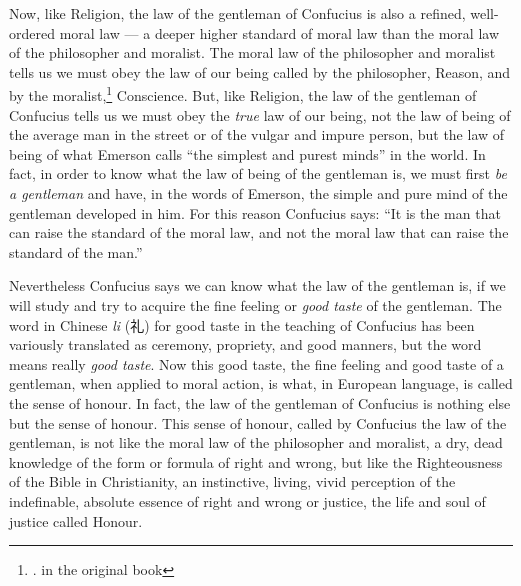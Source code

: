Now, like Religion, the law of the gentleman of Confucius is also a refined, well-ordered moral law --- a deeper higher standard of moral law than the moral law of the philosopher and moralist.
The moral law of the philosopher and moralist tells us we must obey the law of our being called by the philosopher, Reason, and by the moralist,\footnote{. in the original book} Conscience.
But, like Religion, the law of the gentleman of Confucius tells us we must obey the \emph{true} law of our being, not the law of being of the average man in the street or of the vulgar and impure person, but the law of being of what Emerson calls ``the simplest and purest minds'' in the world.
In fact, in order to know what the law of being of the gentleman is, we must first \emph{be a gentleman} and have, in the words of Emerson, the simple and pure mind of the gentleman developed in him.
For this reason Confucius says: ``It is the man that can raise the standard of the moral law, and not the moral law that can raise the standard of the man.''\cite{num21}

Nevertheless Confucius says we can know what the law of the gentleman is, if we will study and try to acquire the fine feeling or \emph{good taste} of the gentleman.
The word in Chinese \emph{li} (礼) for good taste in the teaching of Confucius has been variously translated as ceremony, propriety, and good manners, but the word means really \emph{good taste}.
Now this good taste, the fine feeling and good taste of a gentleman, when applied to moral action, is what, in European language, is called the sense of honour.
In fact, the law of the gentleman of Confucius is nothing else but the sense of honour.
This sense of honour, called by Confucius the law of the gentleman, is not like the moral law of the philosopher and moralist, a dry, dead knowledge of the form or formula of right and wrong, but like the Righteousness of the Bible in Christianity, an instinctive, living, vivid perception of the indefinable, absolute essence of right and wrong or justice, the life and soul of justice called Honour.

